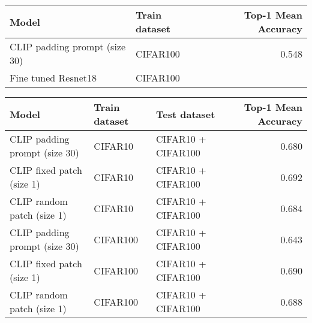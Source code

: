 \documentclass[11pt]{article}
\begin{document}
\begin{center}
\begin{tabular}{llr}
Model & Train dataset & Top-1 Mean Accuracy\\
\hline
CLIP padding prompt (size 30) & CIFAR100 & 0.548\\
Fine tuned Resnet18 & CIFAR100 & \\
\end{tabular}
\end{center}



\begin{center}
\begin{tabular}{lllr}
Model & Train dataset & Test dataset & Top-1 Mean Accuracy\\
\hline
CLIP padding prompt (size 30) & CIFAR10 & CIFAR10 + CIFAR100 & 0.680\\
CLIP fixed patch (size 1) & CIFAR10 & CIFAR10 + CIFAR100 & 0.692\\
CLIP random patch (size 1) & CIFAR10 & CIFAR10 + CIFAR100 & 0.684\\
CLIP padding prompt (size 30) & CIFAR100 & CIFAR10 + CIFAR100 & 0.643\\
CLIP fixed patch (size 1) & CIFAR100 & CIFAR10 + CIFAR100 & 0.690\\
CLIP random patch (size 1) & CIFAR100 & CIFAR10 + CIFAR100 & 0.688\\
\end{tabular}
\end{center}
\end{document}
